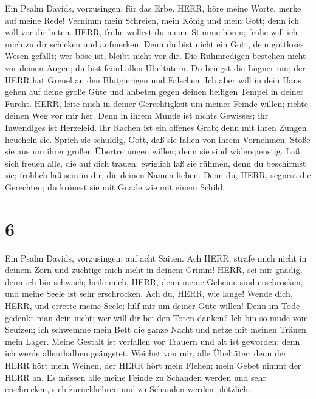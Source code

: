  Ein Psalm Davids, vorzusingen, für das Erbe. HERR, höre
meine Worte, merke auf meine Rede!  Vernimm mein Schreien,
mein König und mein Gott; denn ich will vor dir beten. 
HERR, frühe wollest du meine Stimme hören; frühe will ich mich zu dir
schicken und aufmerken.  Denn du bist nicht ein Gott, dem
gottloses Wesen gefällt; wer böse ist, bleibt nicht vor dir.
 Die Ruhmredigen bestehen nicht vor deinen Augen; du bist
feind allen Übeltätern.  Du bringst die Lügner um; der HERR
hat Greuel an den Blutgierigen und Falschen.  Ich aber will
in dein Haus gehen auf deine große Güte und anbeten gegen deinen
heiligen Tempel in deiner Furcht.  HERR, leite mich in
deiner Gerechtigkeit um meiner Feinde willen; richte deinen Weg vor mir
her.  Denn in ihrem Munde ist nichts Gewisses; ihr
Inwendiges ist Herzeleid. Ihr Rachen ist ein offenes Grab; denn mit
ihren Zungen heucheln sie.  Sprich sie schuldig, Gott, daß
sie fallen von ihrem Vornehmen. Stoße sie aus um ihrer großen
Übertretungen willen; denn sie sind widerspenstig.  Laß
sich freuen alle, die auf dich trauen; ewiglich laß sie rühmen, denn du
beschirmst sie; fröhlich laß sein in dir, die deinen Namen lieben.
 Denn du, HERR, segnest die Gerechten; du krönest sie mit
Gnade wie mit einem Schild.

\hypertarget{section-5}{%
\section{6}\label{section-5}}

 Ein Psalm Davids, vorzusingen, auf acht Saiten. Ach HERR,
strafe mich nicht in deinem Zorn und züchtige mich nicht in deinem
Grimm!  HERR, sei mir gnädig, denn ich bin schwach; heile
mich, HERR, denn meine Gebeine sind erschrocken,  und meine
Seele ist sehr erschrocken. Ach du, HERR, wie lange!  Wende
dich, HERR, und errette meine Seele; hilf mir um deiner Güte willen!
 Denn im Tode gedenkt man dein nicht; wer will dir bei den
Toten danken?  Ich bin so müde vom Seufzen; ich schwemme
mein Bett die ganze Nacht und netze mit meinen Tränen mein Lager.
 Meine Gestalt ist verfallen vor Trauern und alt ist
geworden; denn ich werde allenthalben geängstet.  Weichet
von mir, alle Übeltäter; denn der HERR hört mein Weinen, 
der HERR hört mein Flehen; mein Gebet nimmt der HERR an. 
Es müssen alle meine Feinde zu Schanden werden und sehr erschrecken,
sich zurückkehren und zu Schanden werden plötzlich.

